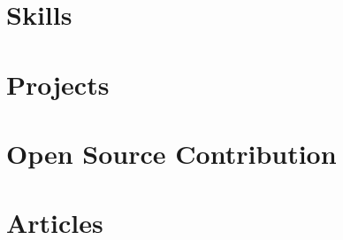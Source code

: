 \documentclass[letter, 11pt]{article}
\begin{document}


\section{Skills}


\section{Projects}


\section{Open Source Contribution}


\section{Articles}


%
\end{document}
